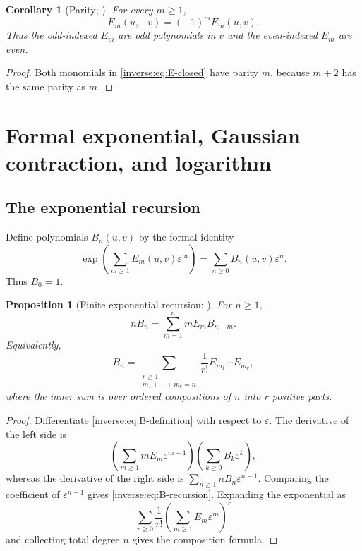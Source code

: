 \documentclass[11pt,oneside]{article}
\newtheorem{proposition}[theorem]{Proposition}
\newtheorem{corollary}[theorem]{Corollary}
\theoremstyle{definition}
\theoremstyle{remark}
\begin{document}
\begin{corollary}[Parity; \Formalized]
\label{inverse:cor:E-parity}
For every $m\geq1$,
\[
 E_m(u,-v)=(-1)^mE_m(u,v).
\]
Thus the odd-indexed $E_m$ are odd polynomials in $v$ and the
even-indexed $E_m$ are even.
\end{corollary}

\begin{proof}
Both monomials in \eqref{inverse:eq:E-closed} have parity $m$, because $m+2$ has
the same parity as $m$.
\end{proof}

\section{Formal exponential, Gaussian contraction, and logarithm}
\label{inverse:sec:coefficient-formulas}

\subsection{The exponential recursion}

Define polynomials $B_n(u,v)$ by the formal identity
\begin{equation}
 \exp\!\left(\sum_{m\geq1}E_m(u,v)\varepsilon^m\right)
 =\sum_{n\geq0}B_n(u,v)\varepsilon^n.
 \label{inverse:eq:B-definition}
\end{equation}
Thus $B_0=1$.

\begin{proposition}[Finite exponential recursion; \Formalized]
\label{inverse:prop:exp-recursion}
For $n\geq1$,
\begin{equation}
 nB_n=\sum_{m=1}^n mE_mB_{n-m}. \label{inverse:eq:B-recursion}
\end{equation}
Equivalently,
\[
 B_n=\sum_{\substack{r\geq1\\m_1+\cdots+m_r=n}}
 \frac1{r!}E_{m_1}\cdots E_{m_r},
\]
where the inner sum is over ordered compositions of $n$ into $r$ positive
parts.
\end{proposition}

\begin{proof}
Differentiate \eqref{inverse:eq:B-definition} with respect to $\varepsilon$.
The derivative of the left side is
\[
 \left(\sum_{m\geq1}mE_m\varepsilon^{m-1}\right)
 \left(\sum_{k\geq0}B_k\varepsilon^k\right),
\]
whereas the derivative of the right side is
$\sum_{n\geq1}nB_n\varepsilon^{n-1}$.  Comparing the coefficient of
$\varepsilon^{n-1}$ gives \eqref{inverse:eq:B-recursion}.  Expanding the
exponential as
\[
 \sum_{r\geq0}\frac1{r!}
 \left(\sum_{m\geq1}E_m\varepsilon^m\right)^r
\]
and collecting total degree $n$ gives the composition formula.
\end{proof}
\end{document}
